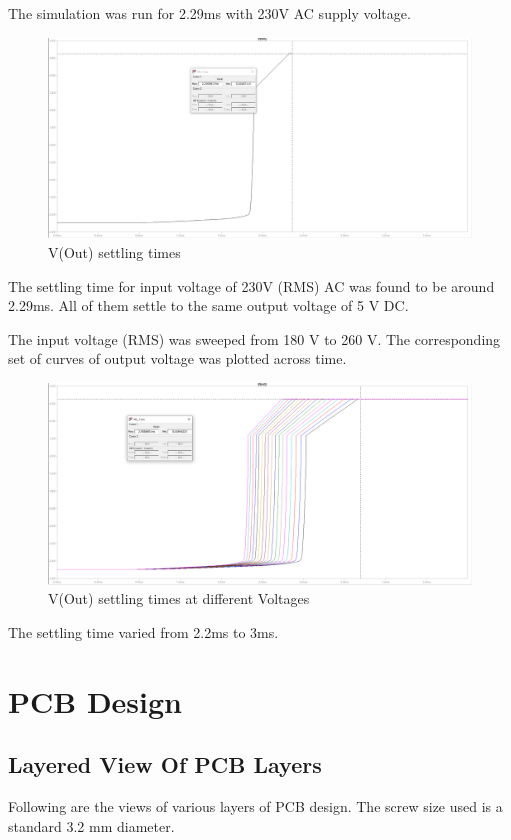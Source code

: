 \documentclass{article}
\begin{document}
The simulation was run for 2.29ms with 230V AC supply voltage. 

\begin{figure}[h!]
\centerline{\includegraphics[scale=.4]{Images/6.PNG}}
\caption{V(Out) settling times}
\label{figb}
\end{figure}
The settling time for input voltage of 230V (RMS) AC was found to be around 2.29ms. All of them settle to the same output voltage of 5 V DC.

\newpage
The input voltage (RMS) was sweeped from 180 V to 260 V. The corresponding set of curves of output voltage was plotted across time.

\begin{figure}[h!]
\centerline{\includegraphics[scale=.4]{Images/7.PNG}}
\caption{V(Out) settling times at different Voltages}
\label{figb}
\end{figure}

The settling time varied from 2.2ms to 3ms.

\section{PCB Design}
% 

\subsection{Layered View Of PCB Layers}
Following are the views of various layers of PCB design. The screw size used is a standard 3.2 mm diameter.
\end{document}

